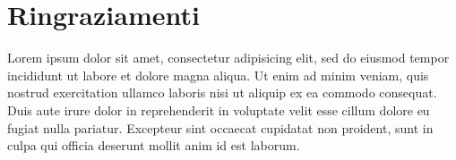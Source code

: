 
\begingroup
\let\clearpage\relax
\let\cleardoublepage\relax
\let\cleardoublepage\relax
\chapter*{Ringraziamenti}
Lorem ipsum dolor sit amet, consectetur adipisicing elit, sed do eiusmod tempor incididunt ut labore et dolore magna aliqua. Ut enim ad minim veniam, quis nostrud exercitation ullamco laboris nisi ut aliquip ex ea commodo consequat. Duis aute irure dolor in reprehenderit in voluptate velit esse cillum dolore eu fugiat nulla pariatur. Excepteur sint occaecat cupidatat non proident, sunt in culpa qui officia deserunt mollit anim id est laborum.
\endgroup
